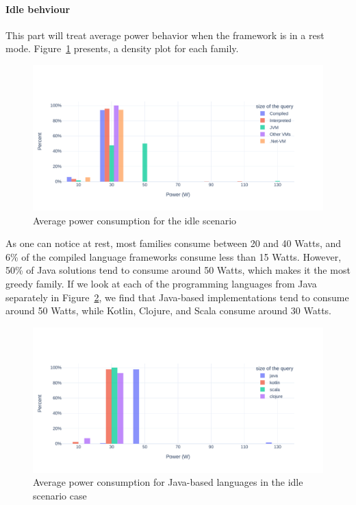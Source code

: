 \paragraph{Idle behviour}
This part will treat average power behavior when the framework is in a rest mode.
Figure~\ref{fig:av_power_idle} presents, a density plot for each family.

\begin{figure}[bht]
    \centering
    \includegraphics[width=1.0\columnwidth]{imgs/av_power_idle}
    \caption{Average power consumption for the idle scenario}
    \label{fig:av_power_idle}
\end{figure}

As one can notice at rest, most families consume between 20 and 40 Watts, and 6\% of the compiled language frameworks consume less than 15 Watts.
However, 50\% of Java solutions tend to consume around 50 Watts, which makes it the most greedy family.
If we look at each of the programming languages from Java separately in Figure~\ref{fig:av_power_java_idle}, we find that Java-based implementations tend to consume around 50 Watts, while Kotlin, Clojure, and Scala consume around 30 Watts.

\begin{figure}[bht]
    \centering
    \includegraphics[width=1.0\columnwidth]{imgs/av_power_java_idle}
    \caption{Average power consumption for Java-based languages in the idle scenario case}
    \label{fig:av_power_java_idle}
\end{figure}

